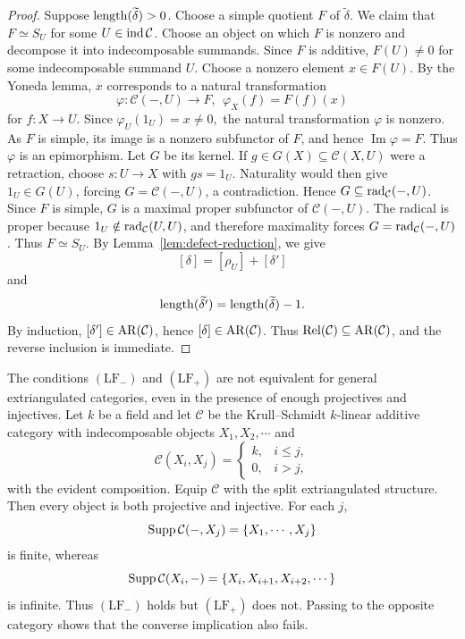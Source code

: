 \documentclass[11pt, twoside]{article}
\def\C{\mathcal{C}}
\numberwithin{equation}{section}
\begin{document}
\begin{proof}
Suppose $\operatorname{length}(\widetilde\delta)>0$.  Choose a simple quotient $F$ of
$\widetilde\delta$.  We claim that $F\simeq S_U$ for some $U\in\ind\C$.
Choose an object on which $F$ is nonzero and decompose it into indecomposable
summands.  Since $F$ is additive, $F(U)\ne0$ for some indecomposable summand
$U$.  Choose a nonzero element $x\in F(U)$.
 By the Yoneda lemma, $x$
corresponds to a natural transformation
\[
\varphi:\C(-,U)\longrightarrow F,
~~
\varphi_X(f)=F(f)(x)
\]
for $f:X\to U$.  Since
$
\varphi_U(1_U)=x\neq0,
$
the natural transformation $\varphi$ is nonzero.  As $F$ is simple,
its image is a nonzero subfunctor of $F$, and hence
$\operatorname{Im}\varphi=F$.  Thus $\varphi$ is an epimorphism.
Let $G$ be its kernel.  If $g\in G(X)\subseteq\C(X,U)$ were a retraction,
choose $s:U\to X$ with $gs=1_U$.  Naturality would then give
$1_U\in G(U)$, forcing $G=\C(-,U)$, a contradiction.  Hence
$G\subseteq\rad_\C(-,U)$.  Since $F$ is simple, $G$ is a maximal proper
subfunctor of $\C(-,U)$.  The radical is proper because
$1_U\notin\rad_\C(U,U)$, and therefore maximality forces
$G=\rad_\C(-,U)$.  Thus $F\simeq S_U$.
By Lemma~\ref{lem:defect-reduction}, we give
\[
 [\delta]=[\rho_U]+[\delta']
\]
and
\[
 \operatorname{length}(\widetilde{\delta'})=\operatorname{length}(\widetilde\delta)-1.
\]
By induction, $[\delta']\in\AR(\C)$, hence $[\delta]\in\AR(\C)$.
Thus $\Rel(\C)\subseteq\AR(\C)$, and the reverse inclusion is immediate.
\end{proof}

\begin{example}\label{ex:one-sided-not-self-dual}
The conditions $(\mathrm{LF}_-)$ and $(\mathrm{LF}_+)$ are not equivalent
for general extriangulated categories, even in the presence of enough
projectives and injectives.  Let $k$ be a field and let $\C$ be the
Krull--Schmidt $k$-linear additive category with indecomposable objects
$X_1,X_2,\cdots$ and
\[
 \C(X_i,X_j)=
 \begin{cases}
 k,& i\le j,\\
 0,& i>j,
 \end{cases}
\]
with the evident composition.  Equip $\C$ with the split extriangulated
structure.  Then every object is both projective and injective.  For each
$j$,
\[
 \Supp\C(-,X_j)=\{X_1,\cdots,X_j\}
\]
is finite, whereas
\[
 \Supp\C(X_i,-)=\{X_i,X_{i+1},X_{i+2},\cdots\}
\]
is infinite.  Thus $(\mathrm{LF}_-)$ holds but $(\mathrm{LF}_+)$ does not.
Passing to the opposite category shows that the converse implication also
fails.
\end{example}
\end{document}
